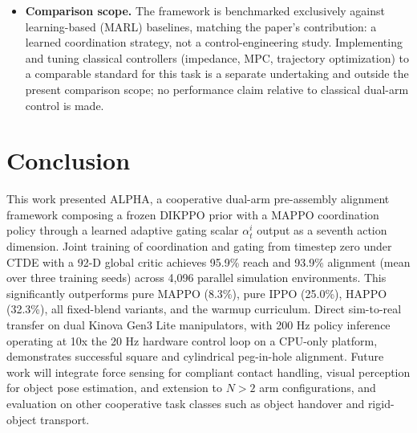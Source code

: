 \documentclass[a4paper,fleqn]{cas-dc}
\begin{document}
\begin{itemize}
\item \textbf{Comparison scope.} The framework is benchmarked exclusively against learning-based (MARL) baselines, matching the paper's contribution: a learned coordination strategy, not a control-engineering study. Implementing and tuning classical controllers (impedance, MPC, trajectory optimization) to a comparable standard for this task is a separate undertaking and outside the present comparison scope; no performance claim relative to classical dual-arm control is made.
\end{itemize}

\section{Conclusion}
\label{conclusion}
This work presented ALPHA, a cooperative dual-arm pre-assembly alignment framework composing a frozen DIKPPO prior with a MAPPO coordination policy through a learned adaptive gating scalar $\alpha^{i}_{t}$ output as a seventh action dimension. Joint training of coordination and gating from timestep zero under CTDE with a 92-D global critic achieves 95.9\% reach and 93.9\% alignment (mean over three training seeds) across 4,096 parallel simulation environments. This significantly outperforms pure MAPPO (8.3\%), pure IPPO (25.0\%), HAPPO (32.3\%), all fixed-blend variants, and the warmup curriculum. Direct sim-to-real transfer on dual Kinova Gen3 Lite manipulators, with 200 Hz policy inference operating at 10x the 20 Hz hardware control loop on a CPU-only platform, demonstrates successful square and cylindrical peg-in-hole alignment. Future work will integrate force sensing for compliant contact handling, visual perception for object pose estimation, and extension to $N>2$ arm configurations, and evaluation on other cooperative task classes such as object handover and rigid-object transport.




\end{document}
